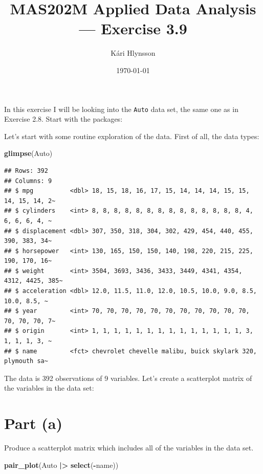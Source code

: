 \documentclass[
  11pt,
  a4paper]{article}
\title{MAS202M Applied Data Analysis --- Exercise 3.9}
\author{Kári Hlynsson}
\date{\today}
\newenvironment{Shaded}{\begin{snugshade}}{\end{snugshade}}
\newcommand{\FunctionTok}[1]{\textcolor[rgb]{0.13,0.29,0.53}{\textbf{#1}}}
\newcommand{\NormalTok}[1]{#1}
\newcommand{\SpecialCharTok}[1]{\textcolor[rgb]{0.81,0.36,0.00}{\textbf{#1}}}
\begin{document}
\maketitle

In this exercise I will be looking into the \texttt{Auto} data set, the same one as in Exercise 2.8.
Start with the packages:

Let's start with some routine exploration of the data. First of all, the data types:

\begin{Shaded}
\begin{Highlighting}[]
\FunctionTok{glimpse}\NormalTok{(Auto)}
\end{Highlighting}
\end{Shaded}

\begin{verbatim}
## Rows: 392
## Columns: 9
## $ mpg          <dbl> 18, 15, 18, 16, 17, 15, 14, 14, 14, 15, 15, 14, 15, 14, 2~
## $ cylinders    <int> 8, 8, 8, 8, 8, 8, 8, 8, 8, 8, 8, 8, 8, 8, 4, 6, 6, 6, 4, ~
## $ displacement <dbl> 307, 350, 318, 304, 302, 429, 454, 440, 455, 390, 383, 34~
## $ horsepower   <int> 130, 165, 150, 150, 140, 198, 220, 215, 225, 190, 170, 16~
## $ weight       <int> 3504, 3693, 3436, 3433, 3449, 4341, 4354, 4312, 4425, 385~
## $ acceleration <dbl> 12.0, 11.5, 11.0, 12.0, 10.5, 10.0, 9.0, 8.5, 10.0, 8.5, ~
## $ year         <int> 70, 70, 70, 70, 70, 70, 70, 70, 70, 70, 70, 70, 70, 70, 7~
## $ origin       <int> 1, 1, 1, 1, 1, 1, 1, 1, 1, 1, 1, 1, 1, 1, 3, 1, 1, 1, 3, ~
## $ name         <fct> chevrolet chevelle malibu, buick skylark 320, plymouth sa~
\end{verbatim}

The data is 392 observations of 9 variables. Let's create a scatterplot matrix of the variables in the data set:

\section{Part (a)}\label{part-a}

Produce a scatterplot matrix which includes all of the variables in the data set.

\begin{Shaded}
\begin{Highlighting}[]
\FunctionTok{pair\_plot}\NormalTok{(Auto }\SpecialCharTok{|\textgreater{}} \FunctionTok{select}\NormalTok{(}\SpecialCharTok{{-}}\NormalTok{name))}
\end{Highlighting}
\end{Shaded}
\end{document}
